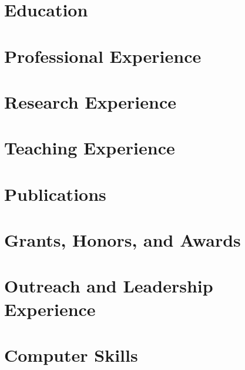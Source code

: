 \documentclass[11pt,letterpaper,sans]{moderncv}
\begin{document}
    \makecvtitle

\section{Education}
    
    

\section{Professional Experience}
    
    
    
    
    
\section{Research Experience}
    
    
    
    

\section{Teaching Experience}
    
    
    
    
    
    

\section{Publications}
    
    
    
    
    

\pagebreak

\section{Grants, Honors, and Awards}
    

\section{Outreach and Leadership Experience}
    

\section{Computer Skills}
    
\end{document}

